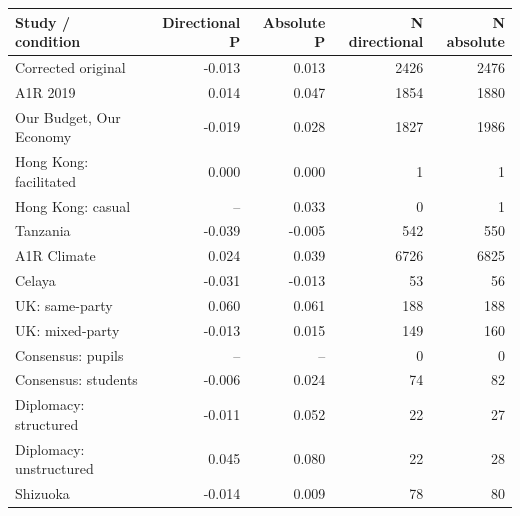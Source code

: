 
\begin{tabular}{lrrrr}
\toprule
Study / condition & Directional P & Absolute P & N directional & N absolute\\
\midrule
Corrected original & -0.013 & 0.013 & 2426 & 2476\\
A1R 2019 & 0.014 & 0.047 & 1854 & 1880\\
Our Budget, Our Economy & -0.019 & 0.028 & 1827 & 1986\\
Hong Kong: facilitated & 0.000 & 0.000 & 1 & 1\\
Hong Kong: casual & -- & 0.033 & 0 & 1\\
\addlinespace
Tanzania & -0.039 & -0.005 & 542 & 550\\
A1R Climate & 0.024 & 0.039 & 6726 & 6825\\
Celaya & -0.031 & -0.013 & 53 & 56\\
UK: same-party & 0.060 & 0.061 & 188 & 188\\
UK: mixed-party & -0.013 & 0.015 & 149 & 160\\
\addlinespace
Consensus: pupils & -- & -- & 0 & 0\\
Consensus: students & -0.006 & 0.024 & 74 & 82\\
Diplomacy: structured & -0.011 & 0.052 & 22 & 27\\
Diplomacy: unstructured & 0.045 & 0.080 & 22 & 28\\
Shizuoka & -0.014 & 0.009 & 78 & 80\\
\bottomrule
\end{tabular}

